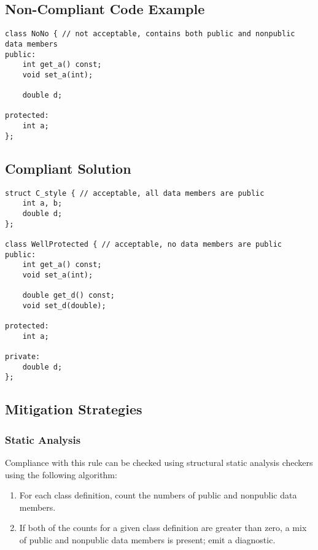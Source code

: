 \subsection{Non-Compliant Code Example}


\begin{verbatim}
class NoNo { // not acceptable, contains both public and nonpublic data members
public:
    int get_a() const;
    void set_a(int);

    double d;

protected:
    int a;
};
\end{verbatim}

\subsection{Compliant Solution}


\begin{verbatim}
struct C_style { // acceptable, all data members are public
    int a, b;
    double d;
};

class WellProtected { // acceptable, no data members are public
public:
    int get_a() const;
    void set_a(int);

    double get_d() const;
    void set_d(double);

protected:
    int a;

private:
    double d;
};
\end{verbatim}

\subsection{Mitigation Strategies}
\subsubsection{Static Analysis} 

Compliance with this rule can be checked using structural static analysis checkers using the following algorithm:

\begin{enumerate}
\item For each class definition, count the numbers of public and nonpublic
data members.
\item If both of the counts for a given class definition are greater than
zero, a mix of public and nonpublic data members is present; emit a
diagnostic.
\end{enumerate}

